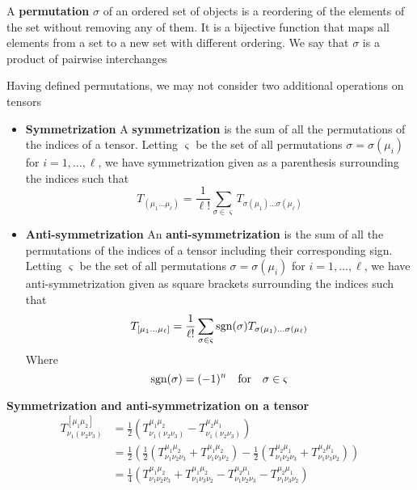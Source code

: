 \documentclass{article}
\begin{document}
 			\begin{defn}
 				A \textbf{permutation} $\sigma$ of an ordered set of objects is a reordering of the elements of the set without removing any of them. It is a bijective function that maps all elements from a set to a new set with different ordering. We say that $\sigma$ is a product of pairwise interchanges
 			\end{defn}
 			Having defined permutations, we may not consider two additional operations on tensors
 			\begin{itemize}
 				\item \textbf{Symmetrization}
 				\subitem A \textbf{symmetrization} is the sum of all the permutations of the indices of a tensor. Letting $\varsigma$ be the set of all permutations $\sigma = \sigma(\mu_i)$ for $i=1,\dots, \ell$, we have symmetrization given as a parenthesis surrounding the indices such that
 				$$ T_{\left(\mu_1 \dots \mu_\ell\right)} = \frac1{\ell!} \sum_{\sigma \in \varsigma} T_{\sigma(\mu_1) \dots \sigma(\mu_\ell)} $$
 				
 				\item \textbf{Anti-symmetrization}
 				\subitem An \textbf{anti-symmetrization} is the sum of all the permutations of the indices of a tensor including their corresponding sign. Letting $\varsigma$ be the set of all permutations $\sigma = \sigma(\mu_i)$ for $i=1,\dots, \ell$, we have anti-symmetrization given as square brackets surrounding the indices such that
 				$$ T_{\left[\mu_1 \dots \mu_\ell\right]} = \frac1{\ell!} \sum_{\sigma \in \varsigma} \text{sgn}(\sigma) T_{\sigma(\mu_1) \dots \sigma(\mu_\ell)} $$
 				Where
 				$$ \text{sgn}(\sigma) = (-1)^n \quad \text{for} \quad \sigma \in \varsigma$$
 			\end{itemize}
 			\begin{exmp}
 				\textbf{Symmetrization and anti-symmetrization on a tensor}
 				\begin{align*}
 					T^{\left[\mu_1\mu_2\right]}_{\nu_1 \left(\nu_2\nu_3\right)} &= \frac{1}{2} \left( T^{\mu_1 \mu_2}_{\nu_1 \left(\nu_2\nu_3\right)} - T^{\mu_2 \mu_1}_{\nu_1 \left(\nu_2\nu_3\right)} \right) \\
 					&=\frac{1}{2} \left( \frac{1}{2} \left( T^{\mu_1 \mu_2}_{\nu_1\nu_2\nu_3} + T^{\mu_1 \mu_2}_{\nu_1\nu_3\nu_2} \right) -  \frac{1}{2} \left( T^{\mu_2 \mu_1}_{\nu_1\nu_2\nu_3} + T^{\mu_2 \mu_1}_{\nu_1\nu_3\nu_2} \right) \right) \\
 					&= \frac{1}{4} \left(T^{\mu_1 \mu_2}_{\nu_1\nu_2\nu_3} + T^{\mu_1 \mu_2}_{\nu_1\nu_3\nu_2} - T^{\mu_2 \mu_1}_{\nu_1\nu_2\nu_3} - T^{\mu_2 \mu_1}_{\nu_1\nu_3\nu_2} \right)
 				\end{align*}
 			\end{exmp}
\end{document}
